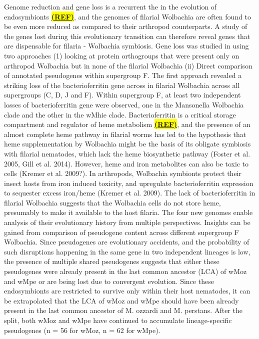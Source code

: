 \documentclass[10pt, a4paper, twocolumn]{article} %
\begin{document}
Genome reduction and gene loss is a recurrent the in the evolution of endosymbionts \underline{\textbf{\colorbox{Yellow}{(REF)}}}, and the genomes of filarial Wolbachia are often found to be even more reduced as compared to their arthropod counterparts. A study of the genes lost during this evolutionary transition can therefore reveal genes that are dispensable for filaria - Wolbachia symbiosis. Gene loss was studied in using two approaches (1) looking at protein orthogroups that were present only on arthropod Wolbachia but in none of the filarial Wolbachia (ii) Direct comparison of annotated pseudogenes within supergroup F. The first approach revealed a striking loss of the bacterioferritin gene across in filarial Wolbachia across all supergroups (C, D, J and F). Within supergroup F, at least two independent losses of bacterioferritin gene were observed, one in the Mansonella Wolbachia clade and the other in the wMhie clade. Bacterioferritin is a critical storage compartment and regulator of heme metabolism \underline{\textbf{\colorbox{Yellow}{(REF)}}}, and the presence of an almost complete heme pathway in filarial worms has led to the hypothesis that heme supplementation by Wolbachia might be the basis of its obligate symbiosis with filarial nematodes, which lack the heme biosynthetic pathway (Foster et al. 2005, Gill et al. 2014). However, heme and iron metabolites can also be toxic to cells (Kremer et al. 2009?). In arthropods, Wolbachia symbionts protect their insect hosts from iron induced toxicity, and upregulate bacterioferritin expression to sequester excess iron/heme (Kremer et al. 2009). The lack of bacterioferritin in filarial Wolbachia suggests that the Wolbachia cells do not store heme, presumably to make it available to the host filaria. 
The four new genomes enable analysis of their evolutionary history from multiple perspectives. Insights can be gained from comparison of pseudogene content across different supergroup F Wolbachia. Since pseudogenes are evolutionary accidents, and the probability of such disruptions happening in the same gene in two independent lineages is low, the presence of multiple shared pseudogenes suggests that either these pseudogenes were already present in the last common ancestor (LCA) of wMoz and wMpe or are being lost due to convergent evolution. Since these endosymbionts are restricted to survive only within their host nematodes, it can be extrapolated that the LCA of wMoz and wMpe should have been already present in the last common ancestor of M. ozzardi and M. perstans. After the split, both wMoz and wMpe have continued to accumulate lineage-specific pseudogenes (n = 56 for wMoz, n = 62 for wMpe).
\end{document}
